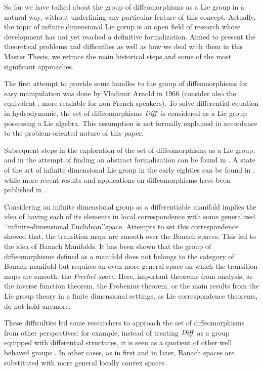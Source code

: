 So far we have talked about the group of diffeomorphisms as a Lie group in a natural way, without underlining any particular feature of this concept. Actually, the topic of infinite dimensional Lie gorup is an open field of research whose development has not yet reached a definitive formalization.
Aimed to present the theoretical problems and difficutlies as well as how we deal with them in this Master Thesis, we retrace the main historical steps and some of the most significant approaches.

The first attempt to provide some handles to the group of diffeomorphisms for easy manipulation was done by Vladimir Arnold in 1966 \cite{arnold1966geometrie} (consider also the equivalent \cite{arnold1998topological}, more readable for non-French speakers). To solve differential equation in hydrodynamic, the set of diffeomorphisms $\text{\emph{Diff}}$ is considered as a Lie group possessing a Lie algebra. This assumption is not formally explained in accordance to the problem-oriented nature of this paper. 

Subsequent steps in the exploration of the set of diffeomorphisms as a Lie group, and in the attempt of finding an abstract formalization can be found in \cite{marsden1970hamiltonian, ebin1970groups, omori1970group, michor1980manifolds, leslie1983lie}. A state of the art of  infinite dimensional Lie group in the early eighties can be found in \cite{Milnor:84:remarks}, while more recent results and applications on diffeomorphisms have been published in \cite{ovsienko1992integrals, bauer2010sobolev, schmid2010infinite,  bauer2011geodesic}.

Considering an infinite dimensional group as a differentiable manifold implies the idea of having each of its elements in local correspondence with some generalized \lq\lq infinite-dimensional Euclidean\rq\rq\phantom{z}space. Attempts to set this correspondence showed that, the transition maps are smooth over the Banach spaces. This led to the idea of Banach Manifolds. It has been shown \cite{khesin2008geometry} that the group of diffeomorphisms defined as a manifold does not belongs to the category of Banach manifold but requires an even more general space on which the transition maps are smooth: the \emph{Frechet space}. Here, important theorems from analysis, as the inverse function theorem, the Frobenius theorem, or the main results from the Lie group theory in a finite dimensional settings, as Lie correspondence theorems, do not hold anymore. 

These difficulties led some researchers to approach the set of diffeomorphisms from other perspectives: 
for example, instead of treating $\text{\emph{Diff}}$ as a group equipped with differential structures, it is seen as a quotient of other well behaved groups \cite{wojtynski1994one}. In other cases, as in \cite{marsden1970hamiltonian} first and in \cite{milnor1984remarks} later, Banach spaces are substituted with more general locally convex spaces.


